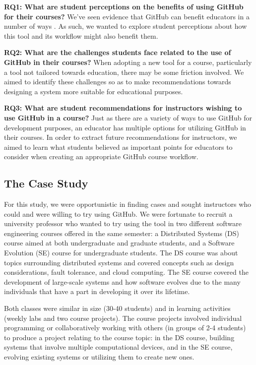 \textbf{RQ1: What are student perceptions on the benefits of using GitHub for their courses?} We've seen evidence that GitHub can benefit educators in a number of ways \cite{zagalsky2015emergence}. As such, we wanted to explore student perceptions about how this tool and its workflow might also benefit them.

\textbf{RQ2: What are the challenges students face related to the use of GitHub in their courses?} When adopting a new tool for a course, particularly a tool not tailored towards education, there may be some friction involved. We aimed to identify these challenges so as to make recommendations towards designing a system more suitable for educational purposes.

\textbf{RQ3: What are student recommendations for instructors wishing to use GitHub in a course?} Just as there are a variety of ways to use GitHub for development purposes, an educator has multiple options for utilizing GitHub in their courses. In order to extract future recommendations for instructors, we aimed to learn what students believed as important points for educators to consider when creating an appropriate GitHub course workflow.

\subsection{The Case Study}
For this study, we were opportunistic in finding cases and sought instructors who could and were willing to try using GitHub. We were fortunate to recruit a university professor who wanted to try using the tool in two different software engineering courses offered in the same semester: a Distributed Systems (DS) course aimed at both undergraduate and graduate students, and a Software Evolution (SE) course for undergraduate students. The DS course was about topics surrounding distributed systems and covered concepts such as design considerations, fault tolerance, and cloud computing. The SE course covered the development of large-scale systems and how software evolves due to the many individuals that have a part in developing it over its lifetime.

Both classes were similar in size (30-40 students) and in learning activities (weekly labs and two course projects). The course projects involved individual programming or collaboratively working with others (in groups of 2-4 students) to produce a project relating to the course topic: in the DS course, building systems that involve multiple computational devices, and in the SE course, evolving existing systems or utilizing them to create new ones.

